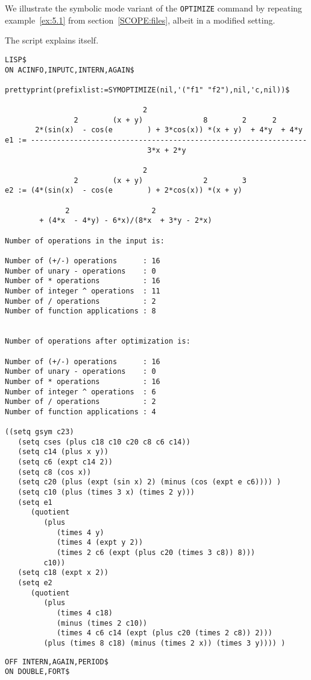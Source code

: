 {We illustrate the symbolic mode variant of the {\tt OPTIMIZE} command by
repeating example~\ref{ex:5.1} from section~\ref{SCOPE:files}, albeit in
a modified setting.

\example\label{ex:9.1}

The script explains itself.
{\small
\begin{verbatim}
LISP$
ON ACINFO,INPUTC,INTERN,AGAIN$

prettyprint(prefixlist:=SYMOPTIMIZE(nil,'("f1" "f2"),nil,'c,nil))$

                                2
                2        (x + y)              8        2      2
       2*(sin(x)  - cos(e        ) + 3*cos(x)) *(x + y)  + 4*y  + 4*y
e1 := ----------------------------------------------------------------
                                 3*x + 2*y

                                2
                2        (x + y)              2        3
e2 := (4*(sin(x)  - cos(e        ) + 2*cos(x)) *(x + y)

              2                   2
        + (4*x  - 4*y) - 6*x)/(8*x  + 3*y - 2*x)

Number of operations in the input is:

Number of (+/-) operations      : 16
Number of unary - operations    : 0
Number of * operations          : 16
Number of integer ^ operations  : 11
Number of / operations          : 2
Number of function applications : 8


Number of operations after optimization is:

Number of (+/-) operations      : 16
Number of unary - operations    : 0
Number of * operations          : 16
Number of integer ^ operations  : 6
Number of / operations          : 2
Number of function applications : 4

((setq gsym c23)
   (setq cses (plus c18 c10 c20 c8 c6 c14))
   (setq c14 (plus x y))
   (setq c6 (expt c14 2))
   (setq c8 (cos x))
   (setq c20 (plus (expt (sin x) 2) (minus (cos (expt e c6)))) )
   (setq c10 (plus (times 3 x) (times 2 y)))
   (setq e1
      (quotient
         (plus
            (times 4 y)
            (times 4 (expt y 2))
            (times 2 c6 (expt (plus c20 (times 3 c8)) 8)))
         c10))
   (setq c18 (expt x 2))
   (setq e2
      (quotient
         (plus
            (times 4 c18)
            (minus (times 2 c10))
            (times 4 c6 c14 (expt (plus c20 (times 2 c8)) 2)))
         (plus (times 8 c18) (minus (times 2 x)) (times 3 y)))) )
\end{verbatim}}
{\small
\begin{verbatim}
OFF INTERN,AGAIN,PERIOD$
ON DOUBLE,FORT$


\end{verbatim}}}

